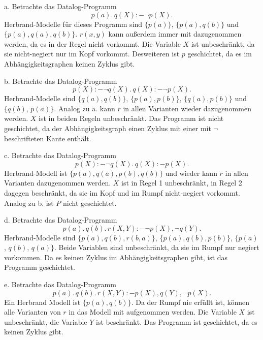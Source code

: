 \documentclass[12pt,a4paper]{amsart}
\begin{document}
\begin{aufgabe1}
a. Betrachte das Datalog-Programm
\[
p(a).\,q(X):-\lnot p(X).
\]
Herbrand-Modelle für dieses Programm sind $\{p(a)\}$, $\{p(a),q(b)\}$ und $\{p(a),q(a),q(b)\}$. $r(x,y)$ kann außerdem immer mit dazugenommen werden, da es in der Regel nicht vorkommt. Die Variable $X$ ist unbeschränkt, da sie nicht-negiert nur im Kopf vorkommt. Desweiteren ist $p$ geschichtet, da es im Abhängigkeitsgraphen keinen Zyklus gibt.

\medskip

b. Betrachte das Datalog-Programm
\[
p(X):-\lnot q(X).\,q(X):-\lnot p(X).
\]
Herbrand-Modelle sind $\{q(a),q(b)\}$, $\{p(a),p(b)\}$, $\{q(a),p(b)\}$ und $\{q(b)$, $p(a)\}$. Analog zu a. kann $r$ in allen Varianten wieder dazugenommen werden. $X$ ist in beiden Regeln unbeschränkt. Das Programm ist nicht geschichtet, da der Abhängigkeitsgraph einen Zyklus mit einer mit $\lnot$ beschrifteten Kante enthält.

\medskip

c. Betrachte das Datalog-Programm
\[
p(X):-\lnot q(X).\,q(X):-p(X).
\]
Herbrand-Modell ist $\{p(a),q(a),p(b),q(b)\}$ und wieder kann $r$ in allen Varianten dazugenommen werden. $X$ ist in Regel 1 unbeschränkt, in Regel 2 dagegen beschränkt, da sie im Kopf und im Rumpf nicht-negiert vorkommt. Analog zu b. ist $P$ nicht geschichtet.

\medskip

d. Betrachte das Datalog-Programm
\[
p(a).\,q(b).\,r(X,Y):-\lnot p(X),\lnot q(Y).
\]
Herbrand-Modelle sind $\{p(a),q(b),r(b,a)\}$, $\{p(a),q(b),p(b)\}$, $\{p(a)$, $q(b)$, $q(a)\}$. Beide Variablen sind unbeschränkt, da sie im Rumpf nur negiert vorkommen. Da es keinen Zyklus im Abhängigkeitsgraphen gibt, ist das Programm geschichtet.

\medskip

e. Betrachte das Datalog-Programm
\[
p(a).\,q(b).\,r(X,Y):-p(X),q(Y),\lnot p(X).
\]
Ein Herbrand Modell ist $\{p(a),q(b)\}$. Da der Rumpf nie erfüllt ist, können alle Varianten von $r$ in das Modell mit aufgenommen werden. Die Variable $X$ ist unbeschränkt, die Variable $Y$ ist beschränkt. Das Programm ist geschichtet, da es keinen Zyklus gibt.
\end{aufgabe1}

\medskip
\end{document}
